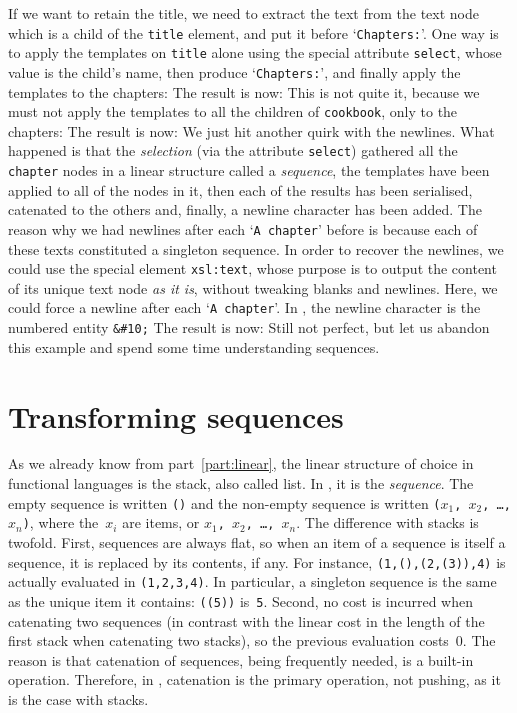 If we want to retain the title, we need to extract the text from the
text node which is a child of the \texttt{title} element, and put it
before `\texttt{Chapters:}'. One way is to apply the templates on
\texttt{title} alone using the special attribute \texttt{select},
whose value is the child's name, then produce `\texttt{Chapters:}',
and finally apply the templates to the chapters:
\noindent The result is now:
\noindent This is not quite it, because we must not apply the
templates to all the children of \texttt{cookbook}, only to the
chapters:
\noindent The result is now:
\noindent We just hit another quirk with the newlines. What happened
is that the \emph{selection} (via the attribute \texttt{select})
gathered all the \texttt{chapter} nodes in a linear structure called a
\emph{sequence}, the templates have been applied to all of the nodes
in it, then each of the results has been serialised, catenated to the
others and, finally, a newline character has been added. The reason
why we had newlines after each `\texttt{A chapter}' before is because
each of these texts constituted a singleton sequence. In order to
recover the newlines, we could use the special element
\texttt{xsl:text}, whose purpose is to output the content of its
unique text node \emph{as it is}, without tweaking blanks and
newlines. Here, we could force a newline after each `\texttt{A
  chapter}'. In \XML, the newline character is the numbered entity
\verb|&#10;| 
\noindent The result is now:
\noindent Still not perfect, but let us abandon this example and spend
some time understanding sequences.

\section{Transforming sequences}

As we already know from part~\ref{part:linear}, the linear structure
of choice in functional languages is the stack, also called list. In
\XSLT, it is the \emph{sequence}. The empty sequence is written
\texttt{()} and the non-empty sequence is written \texttt{(\(x_1\),
  \(x_2\), \dots, \(x_n\))}, where the~\(x_i\) are items, or
\texttt{\(x_1\), \(x_2\), \dots, \(x_n\)}. The difference with stacks
is twofold. First, sequences are always flat, so when an item of a
sequence is itself a sequence, it is replaced by its contents, if
any. For instance, \texttt{(1,(),(2,(3)),4)} is actually evaluated in
\texttt{(1,2,3,4)}. In particular, a singleton sequence is the same as
the unique item it contains: \texttt{((5))} is~\texttt{5}. Second, no
cost is incurred when catenating two sequences (in contrast with the
linear cost in the length of the first stack when catenating two
stacks), so the previous evaluation costs~\(0\). The reason is that
catenation of sequences, being frequently needed, is a built\hyp{}in
operation. Therefore, in \XSLT, catenation is the primary operation,
not pushing, as it is the case with stacks. 

